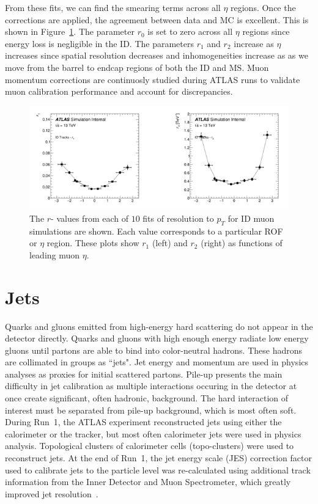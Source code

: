 From these fits, we can find the smearing terms across all $\eta$ regions. Once the corrections are applied, the agreement between data and MC is excellent. This is shown in Figure~\ref{fig:parametrizationeta}. The parameter $r_0$ is set to zero across all $\eta$ regions since energy loss is negligible in the ID. The parameters $r_1$ and $r_2$ increase as $\eta$ increases since spatial resolution decreases and inhomogeneities increase as as we move from the barrel to endcap regions of both the ID and MS. Muon momentum corrections are continuosly studied during ATLAS runs to validate muon calibration performance and account for discrepancies.

\begin{figure}[!h]
	\centering 
    \includegraphics[width=.75\textwidth]{Pictures/parametrizationIDeta.PNG}
    \caption{ The $r$- values from each of $10$ fits of resolution to $p_T$ for ID muon simulations are shown. Each value corresponds to a particular ROF or $\eta$ region. These plots show $r_1$ (left) and $r_2$  (right) as functions of leading muon $\eta$.}
    \label{fig:parametrizationeta}
\end{figure}

\section{Jets}
Quarks and gluons emitted from high-energy hard scattering do not appear in the detector directly. Quarks and gluons with high enough energy radiate low energy gluons until partons are able to bind into color-neutral hadrons. These hadrons are collimated in groups as ``jets". Jet energy and momentum are used in physics analyses as proxies for initial scattered partons. Pile-up presents the main difficulty in jet calibration as multiple interactions occuring in the detector at once create significant, often hadronic, background. The hard interaction of interest must be separated from pile-up background, which is most often soft. During Run~1, the ATLAS experiment reconstructed jets using either the calorimeter or the tracker, but most often calorimeter jets were used in physics analysis. Topological clusters of calorimeter cells (topo-clusters) were used to reconstruct jets. At the end of Run~1, the jet energy scale (JES) correction factor used to calibrate jets to the particle level was re-calculated using additional track information from the Inner Detector and Muon Spectrometer, which greatly improved jet resolution~\cite{JetRun1}. 

